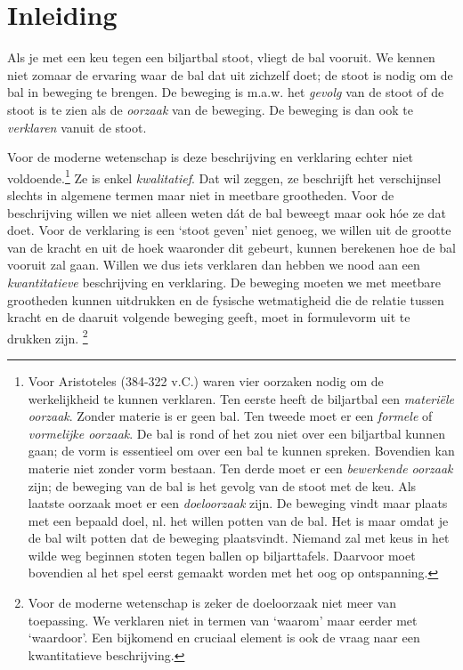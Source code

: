 \chapter*{Inleiding}
Als je met een keu tegen een biljartbal stoot, vliegt de bal vooruit. We kennen niet zomaar de ervaring waar de bal dat uit zichzelf doet; de stoot is nodig om de bal in beweging te brengen. De beweging is m.a.w. het \emph{gevolg} van de stoot of de stoot is te zien als de \emph{oorzaak} van de beweging. De beweging is dan ook te \emph{verklaren} vanuit de stoot.

Voor de moderne wetenschap is deze beschrijving en verklaring echter niet voldoende.\footnote{Voor Aristoteles (384-322 v.C.) waren vier oorzaken nodig om de werkelijkheid te kunnen verklaren. Ten eerste heeft de biljartbal een \emph{materi\"ele oorzaak}. Zonder materie is er geen bal. Ten tweede moet er een \emph{formele} of \emph{vormelijke oorzaak}. De bal is rond of het zou niet over een biljartbal kunnen gaan; de vorm is essentieel om over een bal te kunnen spreken. Bovendien kan materie niet zonder vorm bestaan. Ten derde moet er een \emph{bewerkende oorzaak} zijn; de beweging van de bal is het gevolg van de stoot met de keu. Als laatste oorzaak moet er een \emph{doeloorzaak} zijn. De beweging vindt maar plaats met een bepaald doel, nl. het willen potten van de bal. Het is maar omdat je de bal wilt potten dat de beweging plaatsvindt. Niemand zal met keus in het wilde weg beginnen stoten tegen ballen op biljarttafels. Daarvoor moet bovendien al het spel eerst gemaakt worden met het oog op ontspanning.} Ze is enkel \emph{kwalitatief}. Dat wil zeggen, ze beschrijft het verschijnsel slechts in algemene termen maar niet in meetbare grootheden. Voor de beschrijving willen we niet alleen weten d\'at de bal beweegt maar ook h\'oe ze dat doet. Voor de verklaring is een `stoot geven' niet genoeg, we willen uit de grootte van de kracht en uit de hoek waaronder dit gebeurt, kunnen berekenen hoe de bal vooruit zal gaan. Willen we dus iets verklaren dan hebben we nood aan een \emph{kwantitatieve} beschrijving en verklaring. De beweging moeten we met meetbare grootheden kunnen uitdrukken en de fysische wetmatigheid die de relatie tussen kracht en de daaruit volgende beweging geeft, moet in formulevorm uit te drukken zijn.
\footnote{Voor de moderne wetenschap is zeker de doeloorzaak niet meer van toepassing. We verklaren niet in termen van `waarom' maar eerder met `waardoor'. Een bijkomend en cruciaal element is ook de vraag naar een kwantitatieve beschrijving.}

